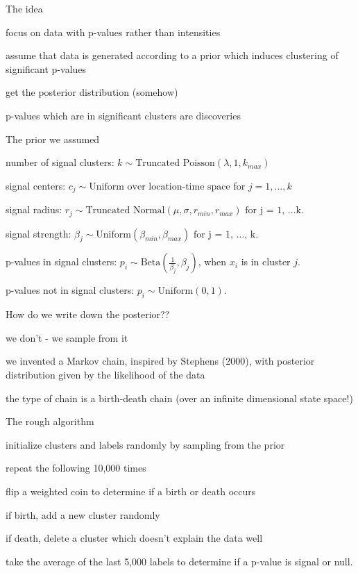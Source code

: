 \documentclass[10pt,mathserif]{beamer}
\begin{document}
\begin{frame} {The idea}
\BIT
\item focus on data with p-values rather than intensities
\item assume that data is generated according to a prior which induces clustering of significant p-values
\item get the posterior distribution (somehow) 
\item p-values which are in significant clusters are discoveries    
\EIT
\end{frame}


\begin{frame} {The prior we assumed}
\BIT
\item number of signal clusters:  $k \sim \mbox{Truncated Poisson}(\lambda,  1, k_{max})$
\item signal centers:   $c_j \sim \mbox{Uniform over location-time space}$ for $j = 1, ... , k$
\item signal radius:  $r_j \sim \mbox{Truncated Normal}(\mu,\sigma,r_{min},r_{max}) \mbox{ for j = 1, \ldots k} $.
\item signal strength:  $\beta_j \sim \mbox{Uniform}(\beta_{min},\beta_{max}) \mbox{ for j = 1, \ldots, k} $.
\item p-values in signal clusters:  $p_i \sim \mbox{Beta}(\frac{1}{\beta_j}, \beta_j)$, when $x_i$ is in cluster $j$.
\item p-values not in signal clusters:  $p_i \sim \mbox{Uniform}(0,1)$.
\EIT %
\end{frame}

\begin{frame}{How do we write down the posterior??} 
\BIT
\item we don't - we sample from it
\item  we invented a Markov chain, inspired by Stephens (2000), with posterior distribution given by the likelihood of the data 
\item  the type of chain is a birth-death chain (over an infinite dimensional state space!)
\EIT 
\end{frame}

\begin{frame} {The rough algorithm}
\BIT 
\item initialize clusters and labels randomly by sampling from the prior 
\item  repeat the following 10,000 times
\BIT
\item flip a weighted coin to determine if a birth or death occurs
\item if birth, add a new cluster randomly 
\item if death, delete a cluster which doesn't explain the data well
\EIT
\item take the average of the last 5,000 labels to determine if a p-value is signal or null. 
\EIT 
\end{frame}
\end{document}
